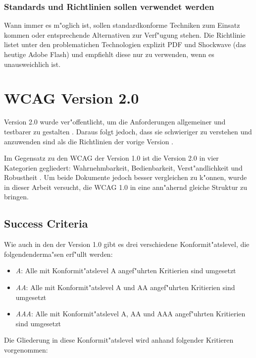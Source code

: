 \documentclass[a4paper,bibtotoc,oneside]{scrbook}
\begin{document}
\subsubsection{Standards und Richtlinien sollen verwendet werden}
Wann immer es m"oglich ist, sollen standardkonforme Techniken zum Einsatz kommen oder entsprechende Alternativen zur Verf"ugung stehen. Die Richtlinie listet unter den problematichen Technologien explizit PDF und Shockwave (das heutige Adobe Flash) und empfiehlt diese nur zu verwenden, wenn es unausweichlich ist. \cite[Abschnitt 6.11]{wcag1}

\section{WCAG Version 2.0}
Version 2.0 wurde ver"offentlicht, um die Anforderungen allgemeiner und testbarer zu gestalten \cite[S. 20]{tool_acc}. Daraus folgt jedoch, dass sie schwieriger zu verstehen und anzuwenden sind als die Richtlinien der vorige Version \cite[S. 24]{mod_software}.

Im Gegensatz zu den WCAG der Version 1.0 ist die Version 2.0 in vier Kategorien gegliedert: Wahrnehmbarkeit, Bedienbarkeit, Verst"andlichkeit und Robustheit \cite[S. 23-24]{mod_software}. Um beide Dokumente jedoch besser vergleichen zu k"onnen, wurde in dieser Arbeit versucht, die WCAG 1.0 in eine ann"ahernd gleiche Struktur zu bringen. 


\subsection{Success Criteria}
Wie auch in den der Version 1.0 gibt es drei verschiedene Konformit"atslevel, die folgendenderma"sen erf"ullt werden: \cite[Abschnitt Understanding Requirement 1]{understand_conform}

\begin{itemize}
\item \emph{A}: Alle mit Konformit"atslevel A angef"uhrten Kritierien sind umgesetzt
\item \emph{AA}: Alle mit Konformit"atslevel A und AA angef"uhrten Kritierien sind umgesetzt
\item \emph{AAA}: Alle mit Konformit"atslevel A, AA und AAA angef"uhrten Kritierien sind umgesetzt
\end{itemize}

Die Gliederung in diese Konformit"atslevel wird anhand folgender Kritieren vorgenommen: \cite[Abschnitt Understanding Levels of Conformance]{understand_conform}
\end{document}

